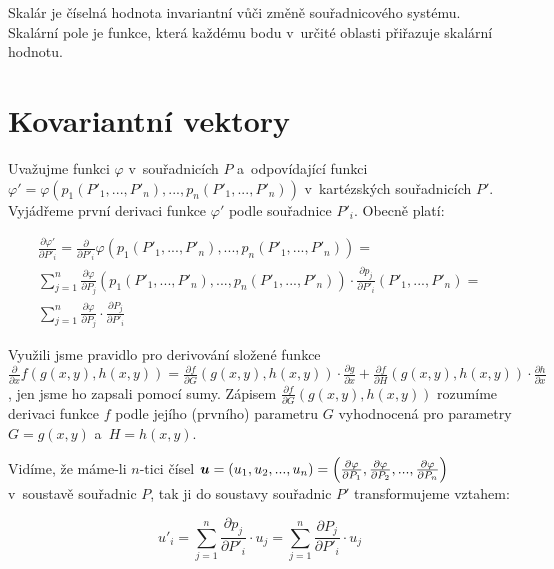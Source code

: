 \begin{fact}
Skalár je číselná hodnota invariantní vůči změně souřadnicového systému. Skalární pole je funkce, která každému bodu v~určité oblasti přiřazuje skalární hodnotu.
\end{fact}

\section{Kovariantní vektory}

Uvažujme funkci \(\varphi\) v~souřadnicích \(P\) a~odpovídající funkci \(\varphi' = \varphi(p_1(P'_1, ..., P'_n), ..., p_n(P'_1, ..., P'_n))\) v~kartézských souřadnicích \(P'\). Vyjádřeme první derivaci funkce \(\varphi'\) podle souřadnice \(P'_i\). Obecně platí:

\begin{equation}
\begin{split}
\frac{\partial \varphi'}{\partial P'_i} = \frac{\partial}{\partial P'_i} \varphi (p_1(P'_1, ..., P'_n), ..., p_n(P'_1, ..., P'_n)) = \\
\sum_{j=1}^n \frac{\partial \varphi}{\partial P_j} (p_1(P'_1, ..., P'_n), ..., p_n(P'_1, ..., P'_n)) \cdot \frac{\partial p_j}{\partial P'_i} (P'_1, ..., P'_n) = \\
\sum_{j=1}^n \frac{\partial \varphi}{\partial P_j} \cdot \frac{\partial P_j}{\partial P'_i}
\end{split}
\end{equation}

Využili jsme pravidlo pro derivování složené funkce \(\frac{\partial}{\partial x} f(g(x, y), h(x, y)) = \frac{\partial f}{\partial G}(g(x, y), h(x, y)) \cdot \frac{\partial g}{\partial x} + \frac{\partial f}{\partial H}(g(x, y), h(x, y)) \cdot \frac{\partial h}{\partial x}\), jen jsme ho zapsali pomocí sumy. Zápisem \(\frac{\partial f}{\partial G}(g(x, y), h(x, y))\) rozumíme derivaci funkce \(f\) podle jejího (prvního) parametru \(G\) vyhodnocená pro parametry \(G = g(x, y)\) a~\(H = h(x, y)\).

Vidíme, že máme-li \(n\)-tici čísel \(\boldsymbol{u} = (u_1, u_2, ..., u_n) = \left( \frac{\partial \varphi}{\partial P_1}, \frac{\partial \varphi}{\partial P_2}, ..., \frac{\partial \varphi}{\partial P_n} \right)\) v~soustavě souřadnic \(P\), tak ji do soustavy souřadnic \(P'\) transformujeme vztahem:

\begin{equation}
\label{eq:kovariantni_vektor}
u'_i = \sum_{j=1}^n \frac{\partial p_j}{\partial P'_i} \cdot u_j = \sum_{j=1}^n \frac{\partial P_j}{\partial P'_i} \cdot u_j
\end{equation}

